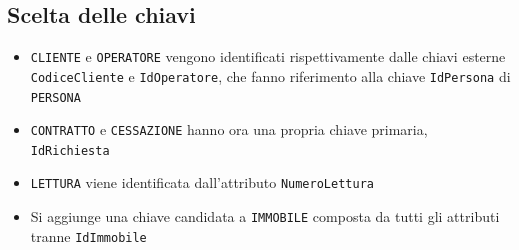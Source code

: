 \documentclass[a4paper,12pt]{report}
\begin{document}
\subsection{Scelta delle chiavi}
\begin{itemize}
    \item \texttt{CLIENTE} e \texttt{OPERATORE} vengono identificati rispettivamente dalle chiavi esterne \texttt{CodiceCliente} e \texttt{IdOperatore}, che fanno riferimento alla chiave \texttt{IdPersona} di \texttt{PERSONA}
    \item \texttt{CONTRATTO} e \texttt{CESSAZIONE} hanno ora una propria chiave primaria, \texttt{IdRichiesta}
    \item \texttt{LETTURA} viene identificata dall'attributo \texttt{NumeroLettura}
    \item Si aggiunge una chiave candidata a \texttt{IMMOBILE} composta da tutti gli attributi tranne \texttt{IdImmobile}
\end{itemize}
\end{document}
